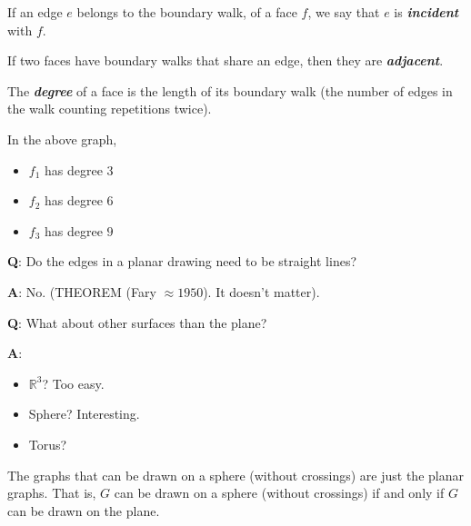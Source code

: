 \begin{defbox}
    \begin{definition}
        If an edge $ e $ belongs to the boundary walk, of a face $ f $,
        we say that $ e $ is \textbf{\emph{incident}} with $ f $.
    \end{definition}
\end{defbox}

\begin{defbox}
    \begin{definition}
        If two faces have boundary walks that share an edge,
        then they are \textbf{\emph{adjacent}}.
    \end{definition}
\end{defbox}

\begin{defbox}
    \begin{definition}
        The \textbf{\emph{degree}} of a face is the length of its
        boundary walk (the number of edges in the walk counting repetitions
        twice).
    \end{definition}
\end{defbox}

\begin{exbox}
    \begin{example}[Degree]
        In the above graph,
        \begin{itemize}
            \item $ f_1 $ has degree $ 3 $
            \item $ f_2 $ has degree $ 6 $
            \item $ f_3 $ has degree $ 9 $
        \end{itemize}
    \end{example}
\end{exbox}

\textbf{Q}: Do the edges in a planar drawing need to be straight
lines?

\textbf{A}: No. (THEOREM (Fary $ \approx 1950 $). It doesn't matter).

\textbf{Q}: What about other surfaces than the plane?

\textbf{A}:
\begin{itemize}
    \item $ \mathbb{R}^3 $? Too easy.
    \item Sphere? Interesting.
    \item Torus?
\end{itemize}

\begin{thmbox}
    \begin{prop}
        The graphs that can be drawn on a sphere (without crossings)
        are just the planar graphs. That is, $ G $ can be drawn
        on a sphere (without crossings)
        if and only if $ G $ can be drawn on the plane.
    \end{prop}
\end{thmbox}

